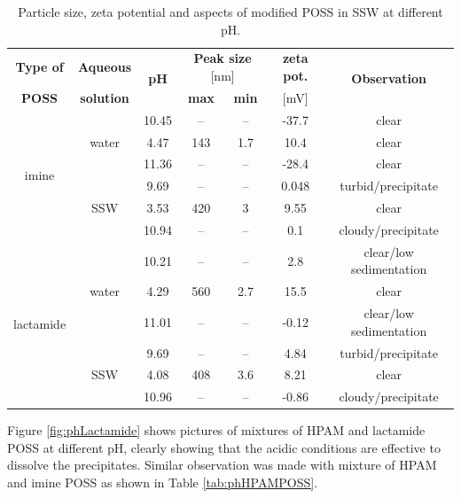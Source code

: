 \begin{table} 
\footnotesize
\centering
\caption{Particle size, zeta potential and aspects of modified POSS in SSW at different pH.}
\label{tab:phPoss}
\begin{tabular}{c| c| c| c| c| c| c } 
\toprule
\textbf{Type of} & \textbf{Aqueous} & \multirow{2}{2em}{\textbf{pH}} & \multicolumn{2}{c}{\textbf{Peak size} [nm]} & \textbf{zeta pot.} & \multirow{2}{6em}{\textbf{Observation}} \\ 
\textbf{POSS}& \textbf{solution} &  & \textbf{max} & \textbf{min} & [mV] & \\
\midrule 
\multirow{6}{3em}{imine}  &  \multirow{3}{3em}{water} & 10.45 & -- & -- & -37.7 & clear\\
  &  & 4.47 & 143 & 1.7 & 10.4 & clear\\
  &  & 11.36 & -- & -- & -28.4 & clear\\
  \cmidrule{2-7}
  & \multirow{3}{3em}{SSW}  & 9.69 & -- & -- & 0.048 & turbid/precipitate\\
  &   & 3.53 & 420 & 3 & 9.55 & clear\\
  &   & 10.94 & -- & -- & 0.1 & cloudy/precipitate\\
\midrule 
\multirow{6}{4em}{lactamide}  &  \multirow{3}{3em}{water} & 10.21 & -- & -- & 2.8 & clear/low sedimentation\\
  &  & 4.29 & 560 & 2.7 & 15.5 & clear\\
  &  & 11.01 & -- & -- & -0.12 & clear/low sedimentation\\
  \cmidrule{2-7}
  & \multirow{3}{3em}{SSW}  & 9.69 & -- & -- & 4.84 & turbid/precipitate\\
  &   & 4.08 & 408 & 3.6 & 8.21 & clear\\
  &   & 10.96 & -- & -- & -0.86 & cloudy/precipitate\\
\bottomrule
\end{tabular}
\end{table}

Figure \ref{fig:phLactamide} shows pictures of mixtures of HPAM and lactamide POSS at different pH, clearly showing that the acidic conditions are effective to dissolve the precipitates.  Similar observation was made with mixture of HPAM and imine POSS as shown in Table \ref{tab:phHPAMPOSS}.

